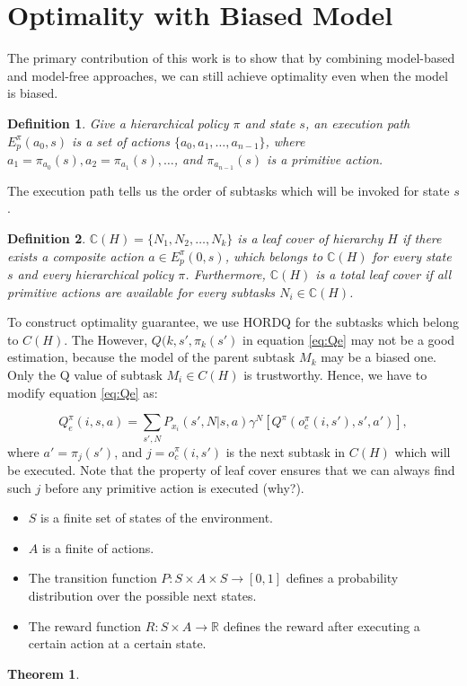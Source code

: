 \documentclass{article} %
\newtheorem{definition}{Definition}
\newtheorem{theorem}{Theorem}
\begin{document}
\section{Optimality with Biased Model}
The primary contribution of this work is to show that by combining model-based and 
model-free approaches, we can still achieve optimality even when the model is biased.


\begin{definition}
    Give a hierarchical policy $\pi$ and state $s$, an execution path $E_p^\pi(a_0, s)$ 
    is a set of actions $\{a_0, a_1, \dots, a_{n-1}\}$, where $a_1=\pi_{a_0}(s), a_2=\pi_{a_1}(s), \dots$,
    and $\pi_{a_{n-1}}(s)$ is a primitive action.
\end{definition}
The execution path tells us the order of subtasks which will be invoked for state $s$.


\begin{definition}
    $\mathbb{C}(H) = \{N_1, N_2, \dots, N_k\}$ is a leaf cover of hierarchy $H$ if 
    there exists a composite action $a \in E_p^{\pi}(0, s)$, which belongs to $\mathbb{C}(H)$ for every
    state $s$ and every hierarchical policy $\pi$.
    Furthermore, $\mathbb{C}(H)$ is a total leaf cover if all primitive actions are available for every 
    subtasks $N_i \in \mathbb{C}(H)$.
\end{definition}

To construct optimality guarantee, we use HORDQ for the subtasks which belong to $C(H)$.
The 
However, $Q(k, s', \pi_k(s')$ in equation \ref{eq:Qe} may not be a good estimation, because the model
of the parent subtask $M_k$ may be a biased one. Only the Q value of subtask $M_i \in C(H)$ is trustworthy.
Hence, we have to modify equation \ref{eq:Qe} as:

\begin{equation}
    Q_e^{\pi}(i, s, a) = \sum_{s', N} P_{x_i}(s', N|s, a)\gamma^N[Q^{\pi}(o_c^{\pi}(i, s'), s', a')],
    \label{eq:OptQe}
\end{equation}
where $a' = \pi_j(s')$, and $j = o_c^{\pi}(i, s')$ is the next subtask in $C(H)$ which will be executed. 
Note that the property of leaf cover ensures that we can always find such $j$ before any primitive
action is executed (why?).


\begin{itemize}{}
\item $S$ is a finite set of states of the environment.
\item $A$ is a finite of actions.
\item The transition function $P:S \times A \times S \rightarrow [0, 1]$ defines a probability distribution over the possible next states. 
\item The reward function $R:S \times A \rightarrow \mathbb{R}$ defines the reward after executing a certain action at a certain state.
\end{itemize}
\begin{theorem}
    
\end{theorem}
\end{document}
